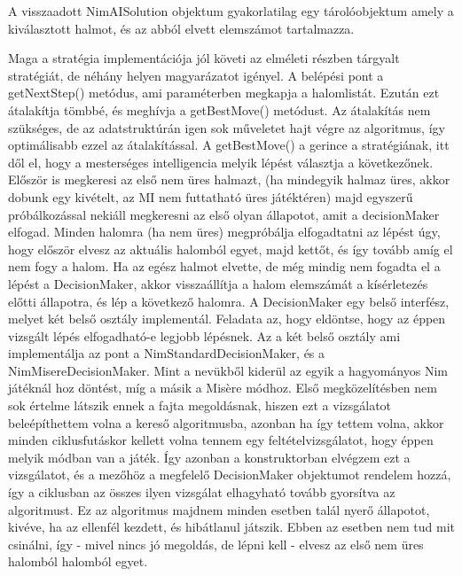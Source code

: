 A visszaadott NimAISolution objektum gyakorlatilag egy tárolóobjektum amely a kiválasztott halmot, és az abból elvett elemszámot tartalmazza.

Maga a stratégia implementációja jól követi az elméleti részben tárgyalt stratégiát, de néhány helyen magyarázatot igényel. \ujsor
A belépési pont a getNextStep() metódus, ami paraméterben megkapja a halomlistát. Ezután ezt átalakítja tömbbé, és meghívja a getBestMove() metódust. Az átalakítás nem szükséges, de az adatstruktúrán igen sok műveletet hajt végre az algoritmus, így optimálisabb ezzel az átalakítással.\ujsor
A getBestMove() a gerince a stratégiának, itt dől el, hogy a mesterséges intelligencia melyik lépést választja a következőnek. Először is megkeresi az első nem üres halmazt, (ha mindegyik halmaz üres, akkor dobunk egy kivételt, az MI nem futtatható üres játéktéren) majd egyszerű próbálkozással nekiáll megkeresni az első olyan állapotot, amit a decisionMaker elfogad. Minden halomra (ha nem üres) megpróbálja elfogadtatni az lépést úgy, hogy először elvesz az aktuális halomból egyet, majd kettőt, és így tovább amíg el nem fogy a halom. Ha az egész halmot elvette, de még mindig nem fogadta el a lépést a DecisionMaker, akkor visszaállítja a halom elemszámát a kísérletezés előtti állapotra, és lép a következő halomra.\ujsor
A DecisionMaker egy belső interfész, melyet két belső osztály implementál. Feladata az, hogy eldöntse, hogy az éppen vizsgált lépés elfogadható-e legjobb lépésnek. Az a két belső osztály ami implementálja az pont a NimStandardDecisionMaker, és a NimMisereDecisionMaker. Mint a nevükből kiderül az egyik a hagyományos Nim játéknál hoz döntést, míg a másik a Misère módhoz. Első megközelítésben nem sok értelme látszik ennek a fajta megoldásnak, hiszen ezt a vizsgálatot beleépíthettem volna a kereső algoritmusba, azonban ha így tettem volna, akkor minden ciklusfutáskor kellett volna tennem egy feltételvizsgálatot, hogy éppen melyik módban van a játék. Így azonban a konstruktorban elvégzem ezt a vizsgálatot, és a mezőhöz a megfelelő DecisionMaker objektumot rendelem hozzá, így a ciklusban az összes ilyen vizsgálat elhagyható tovább gyorsítva az algoritmust.\ujsor
Ez az algoritmus majdnem minden esetben talál nyerő állapotot, kivéve, ha az ellenfél kezdett, és hibátlanul játszik. Ebben az esetben nem tud mit csinálni, így - mivel nincs jó megoldás, de lépni kell - elvesz az első nem üres halomból halomból egyet.



